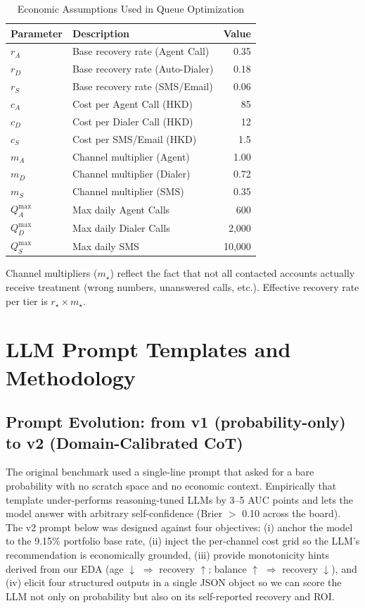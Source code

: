 \documentclass[12pt, a4paper]{article}
\begin{document}
\begin{table}[H]
\centering
\caption{Economic Assumptions Used in Queue Optimization}
\label{tab:econ_params}
\small
\begin{tabular}{@{}llr@{}}
\toprule
\textbf{Parameter} & \textbf{Description} & \textbf{Value}\\
\midrule
$r_A$ & Base recovery rate (Agent Call) & 0.35\\
$r_D$ & Base recovery rate (Auto-Dialer) & 0.18\\
$r_S$ & Base recovery rate (SMS/Email) & 0.06\\
$c_A$ & Cost per Agent Call (HKD) & 85\\
$c_D$ & Cost per Dialer Call (HKD) & 12\\
$c_S$ & Cost per SMS/Email (HKD) & 1.5\\
$m_A$ & Channel multiplier (Agent) & 1.00\\
$m_D$ & Channel multiplier (Dialer) & 0.72\\
$m_S$ & Channel multiplier (SMS) & 0.35\\
$Q_A^{\max}$ & Max daily Agent Calls & 600\\
$Q_D^{\max}$ & Max daily Dialer Calls & 2{,}000\\
$Q_S^{\max}$ & Max daily SMS & 10{,}000\\
\bottomrule
\end{tabular}
\end{table}

Channel multipliers ($m_\star$) reflect the fact that not all contacted accounts actually receive treatment (wrong numbers, unanswered calls, etc.). Effective recovery rate per tier is $r_\star \times m_\star$.


\section{LLM Prompt Templates and Methodology}\label{app:llm_prompts}

\subsection{Prompt Evolution: from v1 (probability-only) to v2 (Domain-Calibrated CoT)}

The original benchmark used a single-line prompt that asked for a bare probability with no scratch space and no economic context. Empirically that template under-performs reasoning-tuned LLMs by 3--5 AUC points and lets the model answer with arbitrary self-confidence (Brier $>$ 0.10 across the board). The v2 prompt below was designed against four objectives: (i) anchor the model to the 9.15\% portfolio base rate, (ii) inject the per-channel cost grid so the LLM's recommendation is economically grounded, (iii) provide monotonicity hints derived from our EDA (age $\downarrow$ $\Rightarrow$ recovery $\uparrow$; balance $\uparrow$ $\Rightarrow$ recovery $\downarrow$), and (iv) elicit four structured outputs in a single JSON object so we can score the LLM not only on probability but also on its self-reported recovery and ROI.
\end{document}
